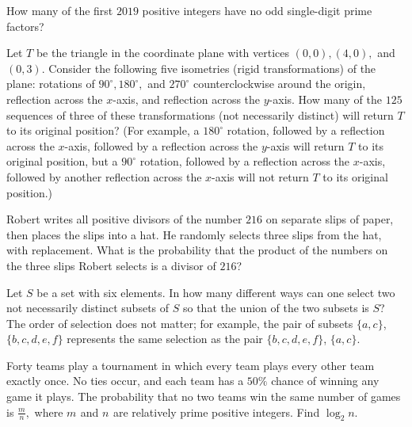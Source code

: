 \documentclass[mast]{lucky}
\begin{document}
\begin{prob}{2}
How many of the first $2019$ positive integers have no odd single-digit prime factors?
\end{prob}
    
     \begin{prob}[AMC 10A 2020/23]{3}
Let $T$ be the triangle in the coordinate plane with vertices $(0,0), (4,0),$ and $(0,3).$ Consider the following five isometries (rigid transformations) of the plane: rotations of $90^{\circ}, 180^{\circ},$ and $270^{\circ}$ counterclockwise around the origin, reflection across the $x$-axis, and reflection across the $y$-axis. How many of the $125$ sequences of three of these transformations (not necessarily distinct) will return $T$ to its original position? (For example, a $180^{\circ}$ rotation, followed by a reflection across the $x$-axis, followed by a reflection across the $y$-axis will return $T$ to its original position, but a $90^{\circ}$ rotation, followed by a reflection across the $x$-axis, followed by another reflection across the $x$-axis will not return $T$ to its original position.)
\end{prob}
    
    \begin{prob}{3}
Robert writes all positive divisors of the number $216$ on separate slips of paper, then places the slips into a hat. He randomly selects three slips from the hat, with replacement. What is the probability that the product of the numbers on the three slips Robert selects is a divisor of $216$?
\end{prob}
    
    \begin{prob}[AIME 1993/8]{4}
Let $S$ be a set with six elements. In how many different ways can one select two not necessarily distinct subsets of $S$ so that the union of the two subsets is $S$? The order of selection does not matter; for example, the pair of subsets $\{a, c\}$, $\{b, c, d, e, f\}$ represents the same selection as the pair $\{b, c, d, e, f\}$, $\{a, c\}$.
\end{prob}
    
    \begin{req}[AIME 1999/13]{4}
Forty teams play a tournament in which every team plays every other team exactly once. No ties occur, and each team has a $50 \%$ chance of winning any game it plays. The probability that no two teams win the same number of games is $\frac mn,$ where $m_{}$ and $n_{}$ are relatively prime positive integers. Find $\log_2 n.$
\end{req}
    
\end{document}
